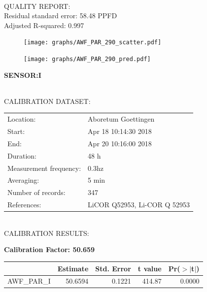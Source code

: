 \documentclass[oneside]{report}
\begin{document}
\hrulefill\\
QUALITY REPORT:\\
Residual standard error: 58.48 PPFD\\
Adjusted R-squared: 0.997



\begin{figure}[H]
  \centering
  \texttt{[image: graphs/AWF\_PAR\_290\_scatter.pdf]}
\end{figure}




\begin{figure}[H]
  \centering
  \texttt{[image: graphs/AWF\_PAR\_290\_pred.pdf]}
\end{figure}

\pagebreak


\begin{center}
\large{\textbf{SENSOR:I}}\\
\end{center}

\hrulefill\\
CALIBRATION DATASET:\\
\begin{table}[h!]
  \centering
  \label{tab:table1}
  \begin{tabular}{ll}
    Location: & Aboretum Goettingen\\ 
    
    
    Start:  & Apr 18 10:14:30 2018 \\
    End:   & Apr 20 10:16:00 2018\\ 
    Duration: & 48 h\\
    Measurement frequency: & 0.3hz\\
    Averaging:  &5 min\\
    Number of records: & 347 \\
    References: & LiCOR Q52953, Li-COR Q 52953 \\
  \end{tabular}
\end{table}

\hrulefill\\
CALIBRATION RESULTS:\\


\begin{center}
\textbf{\large{Calibration Factor: 50.659}}\\
\end{center}
\begin{table}[ht]
\centering
\begin{tabular}{rrrrr}
  \hline
 & Estimate & Std. Error & t value & Pr($>$$|$t$|$) \\ 
  \hline
AWF\_PAR\_I & 50.6594 & 0.1221 & 414.87 & 0.0000 \\ 
   \hline
\end{tabular}
\end{table}
\end{document}
